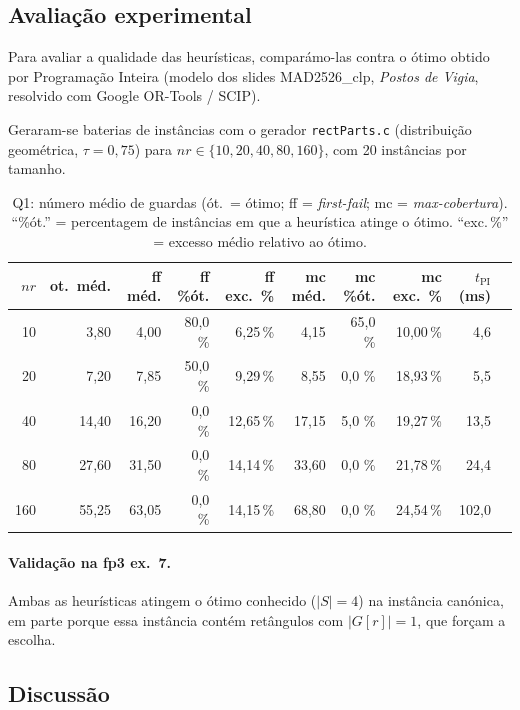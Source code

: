 \documentclass[11pt,a4paper]{article}
\begin{document}
\subsection{Avaliação experimental}

Para avaliar a qualidade das heurísticas, comparámo-las contra o
ótimo obtido por Programação Inteira (modelo dos slides \mbox{MAD2526\_clp},
\textit{Postos de Vigia}, resolvido com Google OR-Tools / SCIP).

Geraram-se baterias de instâncias com o gerador \texttt{rectParts.c}
(distribuição geométrica, $\tau = 0{,}75$) para
$nr \in \{10, 20, 40, 80, 160\}$, com 20 instâncias por tamanho.

\begin{table}[h]
\centering
\small
\setlength{\tabcolsep}{4pt}
\begin{tabular}{rrrrrrrrrr}
\toprule
$nr$ & ot.\ méd. & ff méd. & ff \%ót. & ff exc.\ \% & mc méd. & mc \%ót. & mc exc.\ \% & $t_{\text{PI}}$ (ms) \\
\midrule
 10 & 3{,}80 & 4{,}00 & 80{,}0 \% & 6{,}25\,\% & 4{,}15 & 65{,}0 \% & 10{,}00\,\% & 4{,}6 \\
 20 & 7{,}20 & 7{,}85 & 50{,}0 \% & 9{,}29\,\% & 8{,}55 & 0{,}0 \% & 18{,}93\,\% & 5{,}5 \\
 40 & 14{,}40 & 16{,}20 & 0{,}0 \% & 12{,}65\,\% & 17{,}15 & 5{,}0 \% & 19{,}27\,\% & 13{,}5 \\
 80 & 27{,}60 & 31{,}50 & 0{,}0 \% & 14{,}14\,\% & 33{,}60 & 0{,}0 \% & 21{,}78\,\% & 24{,}4 \\
 160 & 55{,}25 & 63{,}05 & 0{,}0 \% & 14{,}15\,\% & 68{,}80 & 0{,}0 \% & 24{,}54\,\% & 102{,}0 \\
\bottomrule
\end{tabular}
\caption{Q1: número médio de guardas (ót.\ = ótimo;
ff = \emph{first-fail}; mc = \emph{max-cobertura}). ``\%ót.'' = percentagem de
instâncias em que a heurística atinge o ótimo. ``exc.\,\%'' = excesso médio
relativo ao ótimo.}
\label{tab:q1}
\end{table}

\paragraph{Validação na fp3 ex.~7.} Ambas as heurísticas atingem o ótimo
conhecido ($|S| = 4$) na instância canónica, em parte porque essa
instância contém retângulos com $|G[r]|=1$, que forçam a escolha.

\subsection{Discussão}
\end{document}

